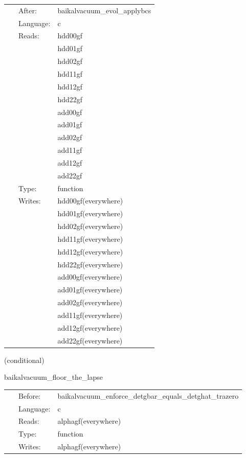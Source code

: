  \begin{tabular*}{160mm}{cll} 
~ & After:  & baikalvacuum\_evol\_applybcs \\ 
~ & Language:  & c \\ 
~ & Reads:  & hdd00gf \\ 
~& ~ &hdd01gf\\ 
~& ~ &hdd02gf\\ 
~& ~ &hdd11gf\\ 
~& ~ &hdd12gf\\ 
~& ~ &hdd22gf\\ 
~& ~ &add00gf\\ 
~& ~ &add01gf\\ 
~& ~ &add02gf\\ 
~& ~ &add11gf\\ 
~& ~ &add12gf\\ 
~& ~ &add22gf\\ 
~ & Type:  & function \\ 
~ & Writes:  & hdd00gf(everywhere) \\ 
~& ~ &hdd01gf(everywhere)\\ 
~& ~ &hdd02gf(everywhere)\\ 
~& ~ &hdd11gf(everywhere)\\ 
~& ~ &hdd12gf(everywhere)\\ 
~& ~ &hdd22gf(everywhere)\\ 
~& ~ &add00gf(everywhere)\\ 
~& ~ &add01gf(everywhere)\\ 
~& ~ &add02gf(everywhere)\\ 
~& ~ &add11gf(everywhere)\\ 
~& ~ &add12gf(everywhere)\\ 
~& ~ &add22gf(everywhere)\\ 
\end{tabular*} 


\vspace{5mm}

   (conditional) 

\hspace{5mm} baikalvacuum\_floor\_the\_lapse 

\hspace{5mm}{\it set lapse = max(lapse\_floor, lapse) } 


\hspace{5mm}

 \begin{tabular*}{160mm}{cll} 
~ & Before:  & baikalvacuum\_enforce\_detgbar\_equals\_detghat\_trazero \\ 
~ & Language:  & c \\ 
~ & Reads:  & alphagf(everywhere) \\ 
~ & Type:  & function \\ 
~ & Writes:  & alphagf(everywhere) \\ 
\end{tabular*} 


